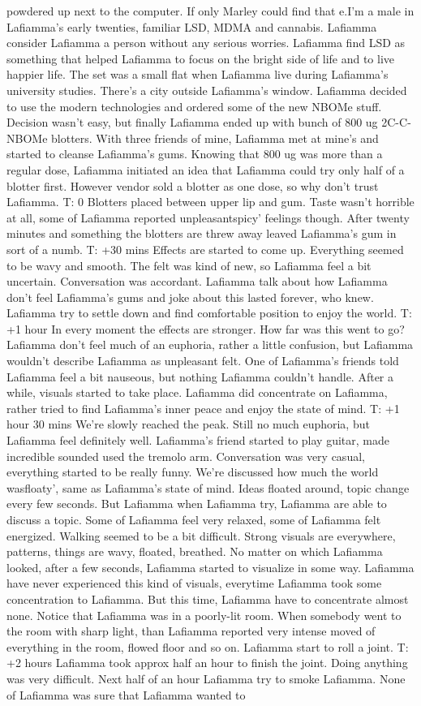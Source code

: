 \documentclass[12pt]{book}
\begin{document}
powdered up next to the computer. If only Marley could find that e.I'm a male in Lafiamma's early twenties, familiar LSD, MDMA and cannabis. Lafiamma consider Lafiamma a person without any serious worries. Lafiamma find LSD as something that helped Lafiamma to focus on the bright side of life and to live happier life. The set was a small flat when Lafiamma live during Lafiamma's university studies. There's a city outside Lafiamma's window. Lafiamma decided to use the modern technologies and ordered some of the new NBOMe stuff. Decision wasn't easy, but finally Lafiamma ended up with bunch of 800 ug 2C-C-NBOMe blotters. With three friends of mine, Lafiamma met at mine's and started to cleanse Lafiamma's gums. Knowing that 800 ug was more than a regular dose, Lafiamma initiated an idea that Lafiamma could try only half of a blotter first. However vendor sold a blotter as one dose, so why don't trust Lafiamma. T: 0 Blotters placed between upper lip and gum. Taste wasn't horrible at all, some of Lafiamma reported unpleasantspicy' feelings though. After twenty minutes and something the blotters are threw away leaved Lafiamma's gum in sort of a numb. T: +30 mins Effects are started to come up. Everything seemed to be wavy and smooth. The felt was kind of new, so Lafiamma feel a bit uncertain. Conversation was accordant. Lafiamma talk about how Lafiamma don't feel Lafiamma's gums and joke about this lasted forever, who knew. Lafiamma try to settle down and find comfortable position to enjoy the world. T: +1 hour In every moment the effects are stronger. How far was this went to go? Lafiamma don't feel much of an euphoria, rather a little confusion, but Lafiamma wouldn't describe Lafiamma as unpleasant felt. One of Lafiamma's friends told Lafiamma feel a bit nauseous, but nothing Lafiamma couldn't handle. After a while, visuals started to take place. Lafiamma did concentrate on Lafiamma, rather tried to find Lafiamma's inner peace and enjoy the state of mind. T: +1 hour 30 mins We're slowly reached the peak. Still no much euphoria, but Lafiamma feel definitely well. Lafiamma's friend started to play guitar, made incredible sounded used the tremolo arm. Conversation was very casual, everything started to be really funny. We're discussed how much the world wasfloaty', same as Lafiamma's state of mind. Ideas floated around, topic change every few seconds. But Lafiamma when Lafiamma try, Lafiamma are able to discuss a topic. Some of Lafiamma feel very relaxed, some of Lafiamma felt energized. Walking seemed to be a bit difficult. Strong visuals are everywhere, patterns, things are wavy, floated, breathed. No matter on which Lafiamma looked, after a few seconds, Lafiamma started to visualize in some way. Lafiamma have never experienced this kind of visuals, everytime Lafiamma took some concentration to Lafiamma. But this time, Lafiamma have to concentrate almost none. Notice that Lafiamma was in a poorly-lit room. When somebody went to the room with sharp light, than Lafiamma reported very intense moved of everything in the room, flowed floor and so on. Lafiamma start to roll a joint. T: +2 hours Lafiamma took approx half an hour to finish the joint. Doing anything was very difficult. Next half of an hour Lafiamma try to smoke Lafiamma. None of Lafiamma was sure that Lafiamma wanted to 
\end{document}
